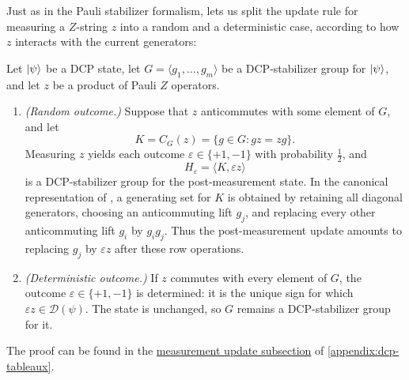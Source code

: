 Just as in the Pauli stabilizer formalism,  lets us split the update rule for measuring a $Z$-string $z$ into a random and a deterministic case, according to how $z$ interacts with the current generators:

\newcommand{\dcpZMeasurementUpdateStatement}{%
    Let $\ket{\psi}$ be a DCP state, let
    $G=\langle g_1,\dots,g_m\rangle$ be a DCP-stabilizer group for
    $\ket{\psi}$, and let $z$ be a product of Pauli $Z$ operators.
    \begin{enumerate}[nosep,label=(\alph*)]
        \item \emph{(Random outcome.)} Suppose that $z$ anticommutes with
        some element of $G$, and let
        \[
            K=C_G(z)=\{g\in G:gz=zg\}.
        \]
        Measuring $z$ yields each outcome
        $\varepsilon\in\{+1,-1\}$ with probability $\tfrac12$, and
        \[
            H_\varepsilon=\langle K,\varepsilon z\rangle
        \]
        is a DCP-stabilizer group for the post-measurement state.  In the
        canonical representation of \Cref{def:canon-form}, a generating set
        for $K$ is obtained by retaining all diagonal generators, choosing
        an anticommuting lift $g_j$, and replacing every other anticommuting
        lift $g_i$ by $g_i g_j$.  Thus the post-measurement update amounts
        to replacing $g_j$ by $\varepsilon z$ after these row operations.
        \item \emph{(Deterministic outcome.)} If $z$ commutes with every
        element of $G$, the outcome $\varepsilon\in\{+1,-1\}$ is
        determined: it is the unique sign for which
        $\varepsilon z\in\mathcal{D}(\psi)$.  The state is unchanged, so
        $G$ remains a DCP-stabilizer group for it.
    \end{enumerate}
}

\begin{proposition}\label{prop:z-update}
\dcpZMeasurementUpdateStatement
\end{proposition}
The proof can be found in the \hyperref[appendix:tableau-update-measurements]{measurement update subsection} of \cref{appendix:dcp-tableaux}.


